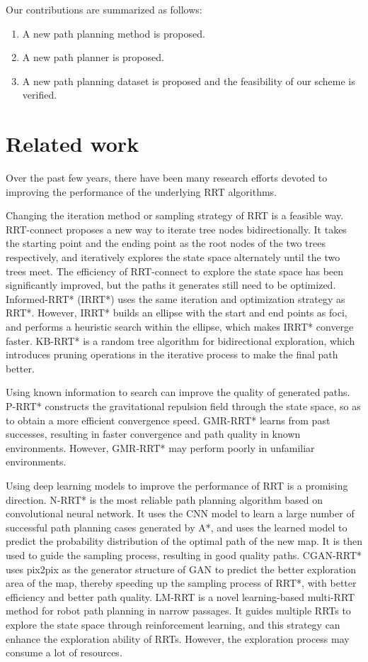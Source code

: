 \documentclass[smallcondensed]{svjour3}     %
\begin{document}
Our contributions are summarized as follows:
\begin{enumerate}[1)]
	\item A new path planning method is proposed.
	\item A new path planner is proposed.
	\item A new path planning dataset is proposed and the feasibility of our scheme is verified.
\end{enumerate}

\section{Related work}\label{section: related-work}
Over the past few years, there have been many research efforts devoted to improving the performance of the underlying RRT algorithms.

Changing the iteration method or sampling strategy of RRT is a feasible way.
RRT-connect \cite{kuffner2000rrt} proposes a new way to iterate tree nodes bidirectionally.
It takes the starting point and the ending point as the root nodes of the two trees respectively, and iteratively explores the state space alternately until the two trees meet.
The efficiency of RRT-connect to explore the state space has been significantly improved, but the paths it generates still need to be optimized.
Informed-RRT* (IRRT*) \cite{2014irrt} uses the same iteration and optimization strategy as RRT*.
However, IRRT* builds an ellipse with the start and end points as foci, and performs a heuristic search within the ellipse, which makes IRRT* converge faster.
KB-RRT* \cite{WANG2021114541} is a random tree algorithm for bidirectional exploration, which introduces pruning operations in the iterative process to make the final path better.

Using known information to search can improve the quality of generated paths.
P-RRT* constructs the gravitational repulsion field through the state space, so as to obtain a more efficient convergence speed.
GMR-RRT* learns from past successes, resulting in faster convergence and path quality in known environments.
However, GMR-RRT* may perform poorly in unfamiliar environments.

Using deep learning models to improve the performance of RRT is a promising direction.
N-RRT* \cite{2020Neural} is the most reliable path planning algorithm based on convolutional neural network.
It uses the CNN model to learn a large number of successful path planning cases generated by A*, and uses the learned model to predict the probability distribution of the optimal path of the new map.
It is then used to guide the sampling process, resulting in good quality paths.
CGAN-RRT* uses pix2pix as the generator structure of GAN \cite{NIPS2014_5ca3e9b1} to predict the better exploration area of the map, thereby speeding up the sampling process of RRT*, with better efficiency and better path quality.
LM-RRT is a novel learning-based multi-RRT method for robot path planning in narrow passages.
It guides multiple RRTs to explore the state space through reinforcement learning, and this strategy can enhance the exploration ability of RRTs.
However, the exploration process may consume a lot of resources.
\end{document}
